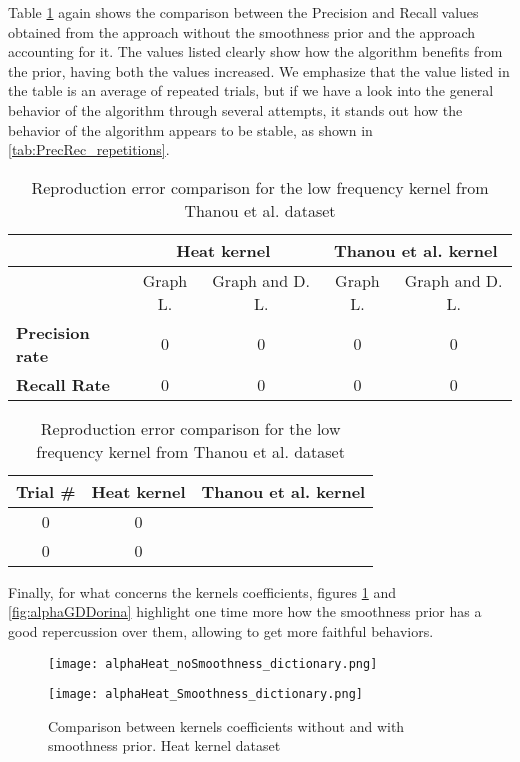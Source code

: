 Table \ref{tab:PrecRec_compSmth} again shows the comparison between the Precision and Recall values obtained from the approach without the smoothness prior and the approach accounting for it. The values listed clearly show how the algorithm benefits from the prior, having both the values increased. We emphasize that the value listed in the table is an average of repeated trials, but if we have a look into the general behavior of the algorithm through several attempts, it stands out how the behavior of the algorithm appears to be stable, as shown in \autoref{tab:PrecRec_repetitions}.

\begin{table}[htbp]
  \centering
  \begin{tabular}{lcccc}
  &\multicolumn{2}{c}{\textbf{Heat kernel}}&\multicolumn{2}{c}{\textbf{Thanou et al. kernel}}\\
  \toprule
  &Graph L. & Graph and D. L. & Graph L. & Graph and D. L.\\ %
    \midrule
    \textbf{Precision rate} & 0 & 0 & 0 & 0\\
    \textbf{Recall Rate} & 0 & 0 & 0 & 0\\
    \bottomrule
  \end{tabular}
  \caption{Reproduction error comparison for the low frequency kernel from Thanou et al. dataset}
  \label{tab:PrecRec_compSmth}
\end{table}

\begin{table}[htbp]
  \centering
  \begin{tabular}{ccc}
  \textbf{Trial \#} & \textbf{Heat kernel} & \textbf{Thanou et al. kernel}\\
  \midrule
    0 & 0\\
    0 & 0\\
    \bottomrule
  \end{tabular}
  \caption{Reproduction error comparison for the low frequency kernel from Thanou et al. dataset}
  \label{tab:PrecRec_repetitions}
\end{table}

Finally, for what concerns the kernels coefficients, figures \ref{fig:alphaGDHeat} and \ref{fig:alphaGDDorina} highlight one time more how the smoothness prior has a good repercussion over them, allowing to get more faithful behaviors.

\begin{figure}
  \centering
  \begin{minipage}[c]{.8\textwidth}
    \centering
    \texttt{[image: alphaHeat\_noSmoothness\_dictionary.png]}
  \end{minipage}
  \begin{minipage}[c]{.8\textwidth}
    \centering
    \texttt{[image: alphaHeat\_Smoothness\_dictionary.png]}
  \end{minipage}
  \caption{Comparison between kernels coefficients without and with smoothness prior. Heat kernel   dataset}
  \label{fig:alphaGDHeat}
\end{figure}

